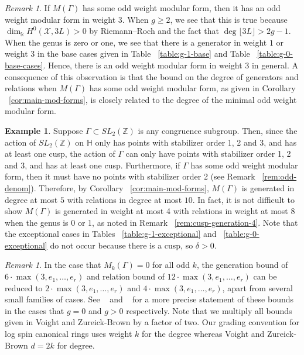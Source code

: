 \documentclass{amsart}
\theoremstyle{plain}
\theoremstyle{definition}
\newtheorem{example}[thm]{Example}
\theoremstyle{remark}
\newtheorem{rem}[thm]{Remark}
\numberwithin{equation}{section}
\newcommand\BH{{\mathbb H}}
\newcommand\BZ{{\mathbb Z}}
\newcommand\Bk{{\Bbbk}}
\newcommand\sx{\mathscr X}
\newcommand{\halfcan}{L}
\begin{document}
\begin{rem}
\label{rem:gen-at-most-three}
If $M(\Gamma)$ has some odd weight modular form, then it has an odd weight modular form in weight $3$. When $g \geq 2$, we see that this is true because $\dim_\Bk H^0(\sx, 3\halfcan) > 0$ by Riemann--Roch and the fact that $\deg \lfloor 3\halfcan \rfloor > 2g - 1$. When the genus is zero or one, we see that there is a generator in weight $1$ or weight $3$ in the base cases given in Table ~\ref{table:g-1-base} and Table ~\ref{table:g-0-base-cases}. Hence, there is an odd weight modular form in weight $3$ in general. A consequence of this observation is that the bound on the degree of generators and relations when $M(\Gamma)$ has some odd weight modular form, as given in Corollary ~\ref{cor:main-mod-forms}, is closely related to the degree of the minimal odd weight modular form.
\end{rem}

\begin{example}
\label{eg:congruence-bounds}
Suppose $\Gamma \subset SL_2(\BZ)$ is any congruence subgroup. Then, since
the action  of $SL_2(\BZ)$ on $\BH$ only has points with stabilizer
order 1, 2 and 3, and has at least one cusp, the
action of $\Gamma$ can only have points with stabilizer order 1, 2 and 3, and has at least one cusp.
Furthermore, if $\Gamma$ has some odd weight modular form, then it must 
have no points with stabilizer order 2 (see Remark ~\ref{rem:odd-denom}). 
Therefore, by Corollary ~\ref{cor:main-mod-forms}, $M(\Gamma)$ is 
generated in degree at most $5$ with relations in degree at most $10$. In fact, it is not difficult to show $M(\Gamma)$ is generated in weight at most 4 with relations in weight at most 8 when the genus is 0 or 1, as noted in Remark ~\ref{rem:cusp-generation-4}. Note that the exceptional cases in Tables ~\ref{table:g-1-exceptional} and ~\ref{table:g-0-exceptional} do not occur because there is a cusp, so $\delta > 0$.
\end{example}

\begin{rem}
\label{rem:factor-two}
In the case that $M_k(\Gamma) = 0$ for all odd $k$, the generation bound of $6 \cdot \max(3, e_1, \ldots, e_r)$ and relation
bound of $12 \cdot \max(3, e_1, \ldots, e_r)$ can be reduced to $2\cdot \max(3,e_1, \ldots, e_r)$ and $4 \cdot \max(3,e_1, \ldots, e_r)$, apart from several small families of cases. See 
~\cite[Theorem 9.3.1]{vzb:stacky} and ~\cite[Theorem 8.7.1]{vzb:stacky} for a more precise statement of these bounds in the cases that $g = 0$ and $g > 0$ respectively. Note that we multiply all bounds given in Voight and Zureick-Brown \cite{vzb:stacky} by a factor of two. Our grading convention for log spin canonical rings uses weight $k$ for the degree whereas Voight and Zureick-Brown $d = 2k$ for degree.
\end{rem}
\end{document}
